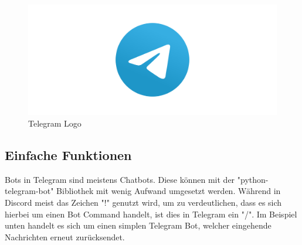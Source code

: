 \documentclass[sigplan,screen]{acmart}
\begin{document}
\begin{figure}[h]
  \centering
  \includegraphics[width=\linewidth]{telegram}
  \caption{Telegram Logo}
\end{figure}

\subsection{Einfache Funktionen}

Bots in Telegram sind meistens Chatbots. Diese können mit der "python-telegram-bot" Bibliothek mit wenig Aufwand umgesetzt werden. Während in Discord meist das Zeichen "!" genutzt wird, um zu verdeutlichen, dass es sich hierbei um einen Bot Command handelt, ist dies in Telegram ein "/". Im Beispiel unten handelt es sich um einen simplen Telegram Bot, welcher eingehende Nachrichten erneut zurücksendet. 
\end{document}
